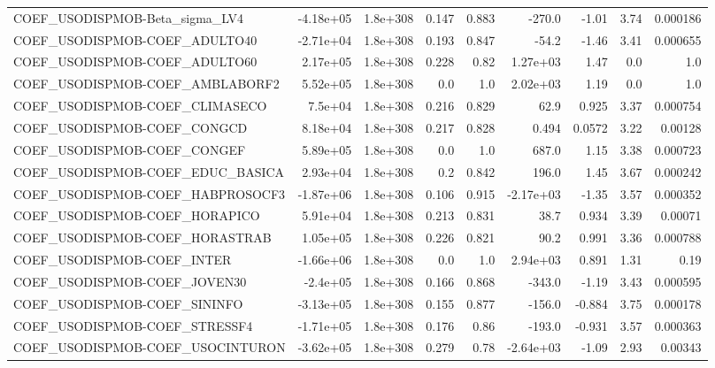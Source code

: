 \begin{tabular}{lrrrrrrrr}
COEF\_USODISPMOB-Beta\_sigma\_LV4    &   -4.18e+05 &     1.8e+308 &   0.147 &    0.883 &     -270.0 &       -1.01 &         3.74 &      0.000186 \\
COEF\_USODISPMOB-COEF\_ADULTO40     &   -2.71e+04 &     1.8e+308 &   0.193 &    0.847 &      -54.2 &       -1.46 &         3.41 &      0.000655 \\
COEF\_USODISPMOB-COEF\_ADULTO60     &    2.17e+05 &     1.8e+308 &   0.228 &     0.82 &   1.27e+03 &        1.47 &          0.0 &           1.0 \\
COEF\_USODISPMOB-COEF\_AMBLABORF2   &    5.52e+05 &     1.8e+308 &     0.0 &      1.0 &   2.02e+03 &        1.19 &          0.0 &           1.0 \\
COEF\_USODISPMOB-COEF\_CLIMASECO    &     7.5e+04 &     1.8e+308 &   0.216 &    0.829 &       62.9 &       0.925 &         3.37 &      0.000754 \\
COEF\_USODISPMOB-COEF\_CONGCD       &    8.18e+04 &     1.8e+308 &   0.217 &    0.828 &      0.494 &      0.0572 &         3.22 &       0.00128 \\
COEF\_USODISPMOB-COEF\_CONGEF       &    5.89e+05 &     1.8e+308 &     0.0 &      1.0 &      687.0 &        1.15 &         3.38 &      0.000723 \\
COEF\_USODISPMOB-COEF\_EDUC\_BASICA  &    2.93e+04 &     1.8e+308 &     0.2 &    0.842 &      196.0 &        1.45 &         3.67 &      0.000242 \\
COEF\_USODISPMOB-COEF\_HABPROSOCF3  &   -1.87e+06 &     1.8e+308 &   0.106 &    0.915 &  -2.17e+03 &       -1.35 &         3.57 &      0.000352 \\
COEF\_USODISPMOB-COEF\_HORAPICO     &    5.91e+04 &     1.8e+308 &   0.213 &    0.831 &       38.7 &       0.934 &         3.39 &       0.00071 \\
COEF\_USODISPMOB-COEF\_HORASTRAB    &    1.05e+05 &     1.8e+308 &   0.226 &    0.821 &       90.2 &       0.991 &         3.36 &      0.000788 \\
COEF\_USODISPMOB-COEF\_INTER        &   -1.66e+06 &     1.8e+308 &     0.0 &      1.0 &   2.94e+03 &       0.891 &         1.31 &          0.19 \\
COEF\_USODISPMOB-COEF\_JOVEN30      &    -2.4e+05 &     1.8e+308 &   0.166 &    0.868 &     -343.0 &       -1.19 &         3.43 &      0.000595 \\
COEF\_USODISPMOB-COEF\_SININFO      &   -3.13e+05 &     1.8e+308 &   0.155 &    0.877 &     -156.0 &      -0.884 &         3.75 &      0.000178 \\
COEF\_USODISPMOB-COEF\_STRESSF4     &   -1.71e+05 &     1.8e+308 &   0.176 &     0.86 &     -193.0 &      -0.931 &         3.57 &      0.000363 \\
COEF\_USODISPMOB-COEF\_USOCINTURON  &   -3.62e+05 &     1.8e+308 &   0.279 &     0.78 &  -2.64e+03 &       -1.09 &         2.93 &       0.00343 \\
\bottomrule
\end{tabular}
